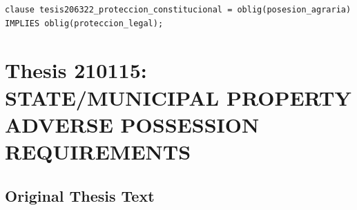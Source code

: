 \documentclass[11pt,a4paper]{article}
\begin{document}
\begin{lstlisting}[style=witnessstyle, language=Witness]
clause tesis206322_proteccion_constitucional = oblig(posesion_agraria) IMPLIES oblig(proteccion_legal);
\end{lstlisting}

\newpage

\section{Thesis 210115: STATE/MUNICIPAL PROPERTY ADVERSE POSSESSION REQUIREMENTS}
\label{thesis:210115}

\subsection{Original Thesis Text}
\end{document}
